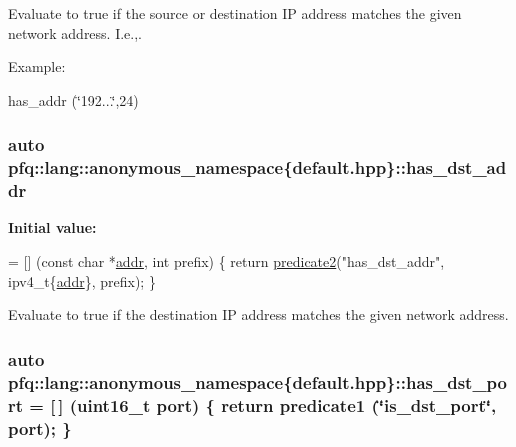 Evaluate to {\ttfamily true} if the source or destination I\+P address matches the given network address. I.\+e.,. 

Example\+:

has\+\_\+addr (\char`\"{}192...\char`\"{},24) \hypertarget{namespacepfq_1_1lang_1_1anonymous__namespace_02default_8hpp_03_a0a53822af0ed8ea341f16a1da5ea83e3}{
\subsubsection[{has\+\_\+dst\+\_\+addr}]{\setlength{\rightskip}{0pt plus 5cm}auto pfq\+::lang\+::anonymous\+\_\+namespace\{default.\+hpp\}\+::has\+\_\+dst\+\_\+addr}}\label{namespacepfq_1_1lang_1_1anonymous__namespace_02default_8hpp_03_a0a53822af0ed8ea341f16a1da5ea83e3}
{\bfseries Initial value\+:}
\begin{DoxyCode}
= [] (\textcolor{keyword}{const} \textcolor{keywordtype}{char} *\hyperlink{namespacepfq_1_1lang_1_1anonymous__namespace_02default_8hpp_03_a13cabe468839119d8d68540e3c60718b}{addr}, \textcolor{keywordtype}{int} prefix)
        \{
            \textcolor{keywordflow}{return} \hyperlink{namespacepfq_1_1lang_a7282b9a2e51359b8db0dcdb9fadf2fd1}{predicate2}(\textcolor{stringliteral}{"has\_dst\_addr"}, ipv4\_t\{\hyperlink{namespacepfq_1_1lang_1_1anonymous__namespace_02default_8hpp_03_a13cabe468839119d8d68540e3c60718b}{addr}\}, prefix);
        \}
\end{DoxyCode}


Evaluate to {\ttfamily true} if the destination I\+P address matches the given network address. 

\hypertarget{namespacepfq_1_1lang_1_1anonymous__namespace_02default_8hpp_03_afa71ece0f4178d0200c0388f503eef14}{
\subsubsection[{has\+\_\+dst\+\_\+port}]{\setlength{\rightskip}{0pt plus 5cm}auto pfq\+::lang\+::anonymous\+\_\+namespace\{default.\+hpp\}\+::has\+\_\+dst\+\_\+port = \mbox{[}$\,$\mbox{]} (uint16\+\_\+t {\bf port}) \{ return {\bf predicate1} (\char`\"{}is\+\_\+dst\+\_\+port\char`\"{}, port); \}}}\label{namespacepfq_1_1lang_1_1anonymous__namespace_02default_8hpp_03_afa71ece0f4178d0200c0388f503eef14}


